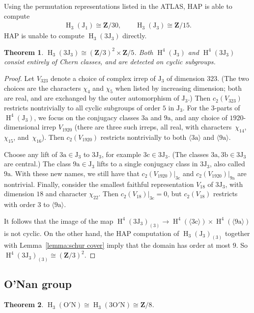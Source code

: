 \documentclass[pdftex]{sigma}
\numberwithin{equation}{section}
\newtheorem{Theorem}{Theorem}[section]
\newcommand\bZ{\mathbf Z}
\newcommand\ra{\mathrm a}
\newcommand\rb{\mathrm b}
\newcommand\rc{\mathrm c}
\newcommand\rJ{\mathrm J}
\DeclareMathOperator\homology{H}
\renewcommand\H{\homology}
\newcommand\<\langle
\renewcommand\>\rangle
\begin{document}
Using the permutation representations listed in the ATLAS, HAP is able to compute
\begin{gather*} \H_3(\rJ_1) \cong \bZ/30, \qquad \H_3(\rJ_3) \cong \bZ/15. \end{gather*}
HAP is unable to compute $\H_3(3\rJ_3)$ directly.
\begin{Theorem}
 $\H_3(3\rJ_3) \cong (\bZ/3)^2 \times \bZ/5$. Both $\H^4(\rJ_3)$ and $\H^4(3\rJ_3)$ consist entirely of Chern classes, and are detected on cyclic subgroups.
\end{Theorem}
\begin{proof}
 Let $V_{323}$ denote a choice of complex irrep of $\rJ_3$ of dimension $323$. (The two choices are the characters $\chi_4$ and $\chi_5$ when listed by increasing dimension; both are real, and are exchanged by the outer automorphism of $\rJ_3$.) Then $c_2(V_{323})$ restricts nontrivially to all cyclic subgroups of order $5$ in $\rJ_3$. For the $3$-parts of $\H^4(\rJ_3)$, we focus on the conjugacy classes $3\ra$ and $9\ra$, and any choice of $1920$-dimensional irrep $V_{1920}$ (there are three such irreps, all real, with characters~$\chi_{14}$,~$\chi_{15}$, and~$\chi_{16}$). Then $c_2(V_{1920})$ restricts nontrivially to both $\langle 3\ra\rangle$ and $\langle 9\ra \rangle$.

 Choose any lift of $3\ra \in \rJ_3$ to $3\rJ_3$, for example $3\rc \in 3\rJ_3$. (The classes $3\ra, 3\rb \in 3\rJ_3$ are central.) The class $9\ra \in \rJ_3$ lifts to a single conjugacy class in $3\rJ_3$, also called $9\ra$. With these new names, we still have that $c_2(V_{1920})|_{3\rc}$ and $c_2(V_{1920})|_{9\ra}$ are nontrivial.
 Finally, consider the smallest faithful representation $V_{18}$ of $3\rJ_3$, with dimension $18$ and character $\chi_{22}$. Then $c_2(V_{18})|_{3\rc} = 0$, but $c_2(V_{18})$ restricts with order $3$ to $\langle 9\ra\rangle$.

 It follows that the image of the map $\H^4(3\rJ_3)_{(3)} \to \H^4(\langle 3\rc\rangle) \times \H^4(\langle 9\ra\rangle)$ is not cyclic. On the other hand, the HAP computation of $\H_3(\rJ_3)_{(3)}$ together with Lemma~\ref{lemma:schur cover} imply that the domain has order at most $9$. So $\H^4(3\rJ_3)_{(3)} \cong (\bZ/3)^2$.
\end{proof}

\subsection{O'Nan group}

\begin{Theorem}\label{thm:on}
 $\H_3(\mathrm{O'N}) \cong \H_3(3\mathrm{O'N}) \cong \bZ/8$.
\end{Theorem}
\end{document}
